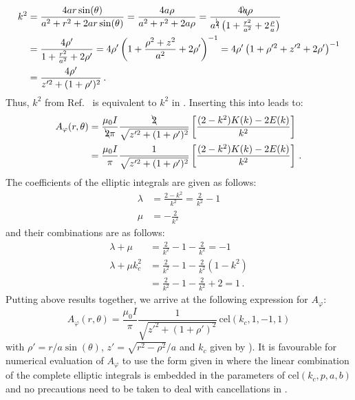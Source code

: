 \begin{align}
  k^2 &= \frac{4 a r \sin(\theta)}{a^2 + r^2 + 2 a r \sin(\theta)}
       = \frac{4 a \rho}{a^2 + r^2 + 2 a \rho}
       = \frac{4 \bcancel{a} \rho}{a^{\bcancel{2}} \left(1 + \frac{r^2}{a^2} + 2 \frac{\rho}{a} \right)} \nonumber \\
  ~   &= \frac{4 \rho'}{1 + \frac{r^2}{a^2} + 2 \rho'}
       = 4 \rho' \left( 1 + \frac{\rho^2 + z^2}{a^2} + 2 \rho' \right)^{-1}
       = 4 \rho' \left( 1 + \rho'^{2} + z'^{2} + 2 \rho' \right)^{-1} \nonumber \\
  ~   &= \frac{4 \rho'}{z'^2 + (1 + \rho')^2} \, .
\end{align}
Thus, $k^2$ from Ref.~\cite{jackson} is equivalent to $k^2$ in .
Inserting this into  leads to:
\begin{align}
  A_\varphi(r, \theta) &= \frac{\mu_0 I}{\bcancel{2} \pi}
                          \frac{\bcancel{2}}{\sqrt{z'^2 + (1 + \rho')^2}}
                          \left[
                            \frac{(2 - k^2)K(k) - 2 E(k)}{k^2}
                          \right] \nonumber \\
           ~           &= \frac{\mu_0 I}{\pi}
                          \frac{1}{\sqrt{z'^2 + (1 + \rho')^2}}
                          \left[
                            \frac{(2 - k^2)K(k) - 2 E(k)}{k^2}
                          \right] \, .
\end{align}
The coefficients of the elliptic integrals are given as follows:
\begin{align}
  \lambda &= \frac{2 - k^2}{k^2} = \frac{2}{k^2} - 1 \\
  \mu     &= -\frac{2}{k^2}
\end{align}
and their combinations are as follows:
\begin{align}
  \lambda + \mu       &= \frac{2}{k^2} - 1 - \frac{2}{k^2}     = -1 \\
  \lambda + \mu k_c^2 &= \frac{2}{k^2} - 1 - \frac{2}{k^2} (1 - k^2) \nonumber \\
          ~           &= \frac{2}{k^2} - 1 - \frac{2}{k^2} + 2 =  1 \, .
\end{align}
Putting above results together, we arrive at the following expression for $A_\varphi$:
\begin{equation}
 \boxed{A_\varphi(r, \theta) = \frac{\mu_0 I}{\pi}
                            \frac{1}{\sqrt{z'^2 + (1 + \rho')^2}} \,\mathrm{cel}(k_c, 1, -1, 1)}
\end{equation}
with $\rho' = r/a \sin(\theta)$, $z' = \sqrt{r^2 - \rho^2}/a$ and $k_c$ given by ).
It is favourable for numerical evaluation of $A_\varphi$ to use the form given in 
where the linear combination of the complete elliptic integrals is embedded in the parameters of $\mathrm{cel}(k_c, p, a, b)$
and no precautions need to be taken to deal with cancellations in .

